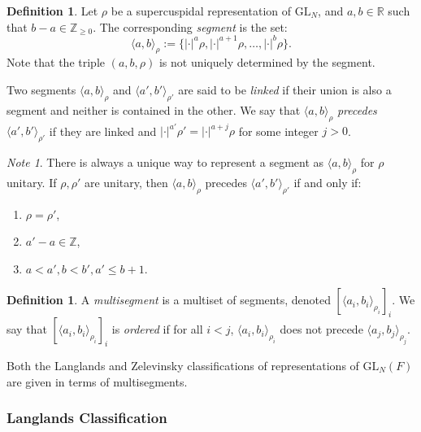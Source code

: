 \documentclass{amsart}
\newcommand{\R}{\mathbb R}
\newcommand{\Z}{\mathbb Z}
\newcommand{\GL}{\mathrm{GL}}
\newcommand{\1}{\m 1}
\theoremstyle{remark}
\newtheorem*{note}{Note}
\theoremstyle{definition}
\newtheorem{dfn}[thm]{Definition}
\numberwithin{equation}{subsection}
\newcommand{\blue}[1]{\textcolor{blue}{#1}}
\begin{document}
\begin{dfn}
Let $\rho$ be a  supercuspidal representation of $\GL_N$, and $a,b \in \R$ such that $b-a \in \Z_{\geq 0}$. The corresponding \emph{segment} is the set:
\[
\langle a, b \rangle_{\rho} := \{|\cdot|^a\rho, |\cdot|^{a+1} \rho, \dotsc, |\cdot|^b \rho\}.
\]
Note that the triple $(a,b,\rho)$ is not uniquely determined by the segment. 


Two segments $\langle a, b \rangle_\rho$ and $\langle a',b' \rangle_{\rho'}$ are said to be \emph{linked} if their union is also a segment and neither is contained in the other. We say that $\langle a, b \rangle_\rho$ \emph{precedes} $\langle a',b' \rangle_{\rho'}$ if they are linked and $|\cdot|^{a'}\rho' = |\cdot|^{a + j}\rho$ for some integer $j > 0$. %
\end{dfn}

\begin{note}
There is always a unique way to represent a segment as $\langle a, b \rangle_\rho$ for $\rho$ unitary. If $\rho,\rho'$ are unitary, then $\langle a, b \rangle_\rho$ precedes $\langle a',b' \rangle_{\rho'}$ if and only if:
\begin{enumerate}
   \item $\rho = \rho'$,
   \item $a' - a \in \Z$,
   \item $a < a', b < b', a' \leq b+1$. 
\end{enumerate}  
\end{note}


\begin{dfn}
A \emph{multisegment} is a multiset of segments, denoted $[\langle a_i,b_i \rangle_{\rho_i}]_i$. We say that $[\langle a_i,b_i \rangle_{\rho_i}]_i$ is \emph{ordered} if for all $i < j$, $\langle a_i,b_i \rangle_{\rho_i}$ does not precede $\langle a_j,b_j \rangle_{\rho_j}$. 
\end{dfn}

Both the Langlands and Zelevinsky classifications of representations of $\GL_N(F)$ are given in terms of multisegments. 

\subsubsection{Langlands Classification}
\end{document}
